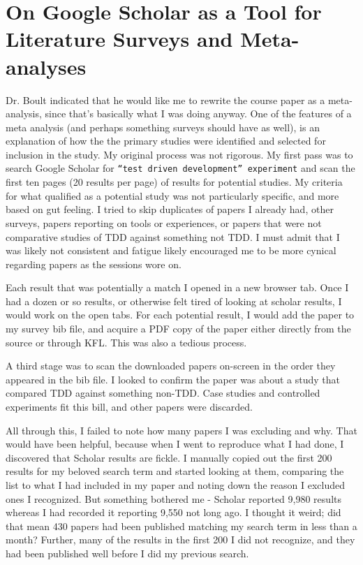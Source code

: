 \documentclass[8pt, letterpaper]{article}
\begin{document}
\maketitle
\section{On Google Scholar as a Tool for Literature Surveys and Meta-analyses}

Dr. Boult indicated that he would like me to rewrite the course paper as a meta-analysis, since that's basically what I was doing anyway.
One of the features of a meta analysis (and perhaps something surveys should have as well), is an explanation of how the the primary studies were identified and selected for inclusion in the study.
My original process was not rigorous.
My first pass was to search Google Scholar for \texttt{``test driven development'' experiment} and scan the first ten pages (20 results per page) of results for potential studies.
My criteria for what qualified as a potential study was not particularly specific, and more based on gut feeling.
I tried to skip duplicates of papers I already had, other surveys, papers reporting on tools or experiences, or papers that were not comparative studies of TDD against something not TDD.
I must admit that I was likely not consistent and fatigue likely encouraged me to be more cynical regarding papers as the sessions wore on.

Each result that was potentially a match I opened in a new browser tab.
Once I had a dozen or so results, or otherwise felt tired of looking at scholar results, I would work on the open tabs.
For each potential result, I would add the paper to my survey bib file, and acquire a PDF copy of the paper either directly from the source or through KFL.
This was also a tedious process.

A third stage was to scan the downloaded papers on-screen in the order they appeared in the bib file.
I looked to confirm the paper was about a study that compared TDD against something non-TDD.
Case studies and controlled experiments fit this bill, and other papers were discarded.

All through this, I failed to note how many papers I was excluding and why.
That would have been helpful, because when I went to reproduce what I had done, I discovered that Scholar results are fickle.
I manually copied out the first 200 results for my beloved search term and started looking at them, comparing the list to what I had included in my paper and noting down the reason I excluded ones I recognized.
But something bothered me - Scholar reported 9,980 results whereas I had recorded it reporting 9,550 not long ago.
I thought it weird; did that mean 430 papers had been published matching my search term in less than a month?
Further, many of the results in the first 200 I did not recognize, and they had been published well before I did my previous search.
\end{document}
